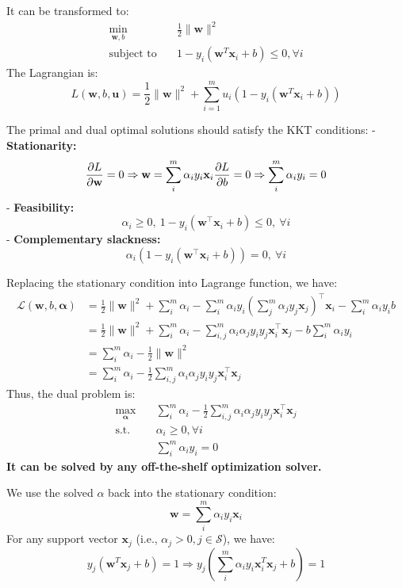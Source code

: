 \documentclass[
]{ctexart}
\begin{document}
It can be transformed to:
\[\begin{aligned}\min_{\mathbf{w}, b} \quad & \frac{1}{2} \|\mathbf{w}\|^2 \\
\text{subject to} \quad & 1 - y_i (\mathbf{w}^T \mathbf{x}_i + b) \leq 0, \forall i
\end{aligned}\] The Lagrangian is:
\[L(\mathbf{w}, b, \mathbf{u}) = \frac{1}{2} \|\mathbf{w}\|^2 + \sum_{i=1}^{m} u_i (1 - y_i (\mathbf{w}^T \mathbf{x}_i + b))\]

The primal and dual optimal solutions should satisfy the KKT conditions:
- \textbf{Stationarity:}
\[\frac{\partial L}{\partial \mathbf{w}} = 0 \Rightarrow \mathbf{w} = \sum_{i}^m \alpha_i y_i \mathbf{x}_i \\
    \frac{\partial L}{\partial b} = 0 \Rightarrow \sum_{i}^m \alpha_i y_i = 0\]
- \textbf{Feasibility:}
\[\alpha_i \geq 0, \ 1 - y_i(\mathbf{w}^\top \mathbf{x}_i + b) \leq 0, \ \forall i\]
- \textbf{Complementary slackness:}
\[\alpha_i(1 - y_i(\mathbf{w}^\top \mathbf{x}_i + b)) = 0, \ \forall i\]

Replacing the stationary condition into Lagrange function, we have: \[
\begin{aligned}
\mathcal{L}(\mathbf{w}, b, \boldsymbol{\alpha}) &= \frac{1}{2}\|\mathbf{w}\|^2 + \sum_{i}^m \alpha_i - \sum_{i}^m \alpha_i y_i \left(\sum_{j}^m \alpha_j y_j \mathbf{x}_j\right)^\top \mathbf{x}_i - \sum_{i}^m \alpha_i y_i b \\
&= \frac{1}{2}\|\mathbf{w}\|^2 + \sum_{i}^m \alpha_i - \sum_{i,j}^m \alpha_i \alpha_j y_i y_j {\mathbf{x}_i^\top \mathbf{x}_j} - b \sum_{i}^m \alpha_i y_i \\
&= \sum_{i}^m \alpha_i - \frac{1}{2}\|\mathbf{w}\|^2 \\
&= \sum_{i}^m \alpha_i - \frac{1}{2} \sum_{i,j}^m \alpha_i \alpha_j y_i y_j {\mathbf{x}_i^\top \mathbf{x}_j}
\end{aligned}
\] Thus, the dual problem is:
\[\begin{aligned}\max_{\boldsymbol{\alpha}} \quad & \sum_{i}^m \alpha_i - \frac{1}{2} \sum_{i,j}^m \alpha_i \alpha_j y_i y_j {\mathbf{x}_i^\top \mathbf{x}_j} \\
\text{s.t.} \quad & \alpha_i \geq 0, \forall i \\
& \sum_{i}^m \alpha_i y_i = 0
\end{aligned}\] \textbf{It can be solved by any off-the-shelf
optimization solver.}

We use the solved \(\alpha\) back into the stationary condition:
\[\mathbf{w} = \sum_{i}^m \alpha_i y_i \mathbf{x}_i\] For any support
vector \(\mathbf{x}_j\) (i.e., \(\alpha_j > 0, j \in \mathcal{S}\)), we
have:
\[y_j (\mathbf{w}^T \mathbf{x}_j + b) = 1 \Rightarrow y_j (\sum_{i}^m \alpha_i y_i \mathbf{x}_i^T \mathbf{x}_j + b) = 1\]
\end{document}
